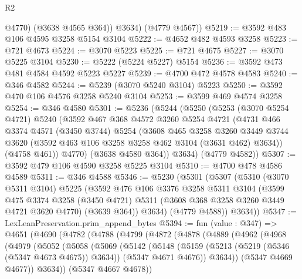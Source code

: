 \begin{lexlean}{R2}
\begin{coremodule}
            @4770)
          (@3638 @4565 @364))
        @3634)
      (@4779 @4567))
@5219 := @3592 @483 @106 @4595 @3258 @5154 @3104
@5222 := @4652 @482 @4593 @3258
@5223 := @721 @4673
@5224 := @3070 @5223
@5225 := @721 @4675
@5227 := @3070 @5225 @3104
@5230 := @5222 (@5224 @5227) @5154
@5236 := @3592 @473 @481 @4584 @4592 @5223 @5227
@5239 := @4700 @472 @4578 @4583
@5240 := @346 @4582
@5244 := @5239 (@3070 @5240 @3104) @5223
@5250 := @3592 @470 @106 @4576 @3258 @5240 @3104
@5253 := @3599 @469 @4574 @3258
@5254 := @346 @4580
@5301 := @5236
    (@5244
      (@5250
        (@5253
          (@3070 @5254 @4721)
          @5240
          (@3592
            @467
            @368
            @4572
            @3260
            @5254
            @4721
            (@4731
              @466
              @3374
              @4571
              (@3450 @3744)
              @5254
              (@3608
                @465
                @3258
                @3260
                @3449
                @3744
                @3620
                (@3592 @463 @106 @3258 @3258 @462 @3104 (@3631 @462) @3634))
              (@4758 @461))
            @4770)
          (@3638 @4580 @364))
        @3634)
      (@4779 @4582))
@5307 := @3592 @479 @106 @4590 @3258 @5225 @3104
@5310 := @4700 @478 @4586 @4589
@5311 := @346 @4588
@5346 := @5230
    (@5301
      (@5307
        (@5310
          (@3070 @5311 @3104)
          @5225
          (@3592
            @476
            @106
            @3376
            @3258
            @5311
            @3104
            (@3599
              @475
              @3374
              @3258
              (@3450 @4721)
              @5311
              (@3608 @368 @3258 @3260 @3449 @4721 @3620 @4770)
              (@3639 @364))
            @3634)
          (@4779 @4588))
        @3634))
@5347 := LexLeanPreservation.prim_append_bytes
@5394 := fun (value : @347) =>
  @4651
    (@4690
      (@4782
        (@4788
          (@4799
            (@4872
              (@4878
                (@4889
                  (@4962
                    (@4968
                      (@4979
                        (@5052
                          (@5058
                            (@5069
                              (@5142
                                (@5148
                                  (@5159
                                    (@5213 (@5219 (@5346 (@5347 @4673 @4675)) @3634))
                                    (@5347 @4671 @4676))
                                  @3634))
                              (@5347 @4669 @4677))
                            @3634))
                        (@5347 @4667 @4678))

\end{coremodule}
\end{lexlean}
